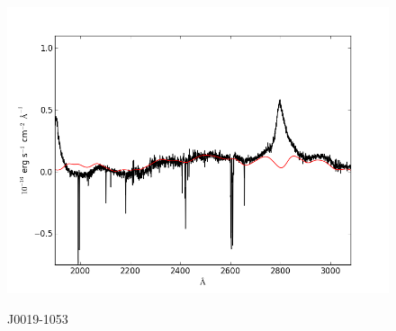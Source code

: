 \documentclass[usenatbib]{mn2e}
\begin{document}
\begin{figure}
\begin{center}
\vspace{5mm}
\includegraphics[width=0.49\linewidth,angle=0]{./red/fe_fit_SBB_12.png}\\

\end{center} 
\caption{J0019-1053 \label{fig:landscape}}   
\end{figure}

\newpage
\end{document}
